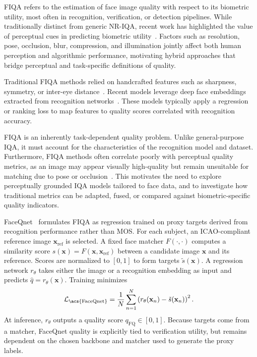 \acs{FIQA} refers to the estimation of face image quality with respect to its biometric utility, most often in recognition, verification, or detection pipelines. While traditionally distinct from generic \acs{NR-IQA}, recent work has highlighted the value of perceptual cues in predicting biometric utility~\cite{survey2022fiqa, abed2025fiqabiometric}. Factors such as resolution, pose, occlusion, blur, compression, and illumination jointly affect both human perception and algorithmic performance, motivating hybrid approaches that bridge perceptual and task-specific definitions of quality.

Traditional \acs{FIQA} methods relied on handcrafted features such as sharpness, symmetry, or inter-eye distance~\cite{phillips2003face}. Recent models leverage deep face embeddings extracted from recognition networks~\cite{terhorst2020serfiq, best2017facerecon}. These models typically apply a regression or ranking loss to map features to quality scores correlated with recognition accuracy.

\acs{FIQA} is an inherently task-dependent quality problem. Unlike general-purpose \acs{IQA}, it must account for the characteristics of the recognition model and dataset. Furthermore, \acs{FIQA} methods often correlate poorly with perceptual quality metrics, as an image may appear visually high-quality but remain unsuitable for matching due to pose or occlusion~\cite{babnik2022bias}. This motivates the need to explore perceptually grounded \acs{IQA} models tailored to face data, and to investigate how traditional metrics can be adapted, fused, or compared against biometric-specific quality indicators.

\acf{FaceQnet}~\cite{hernandez2019faceqnet} formulates \acs{FIQA} as regression trained on proxy targets derived from recognition performance rather than \acs{MOS}. For each subject, an \acs{ICAO}-compliant reference image \(\mathbf{x}_{\mathrm{ref}}\) is selected. A fixed face matcher \(F(\cdot,\cdot)\) computes a similarity score \(s(\mathbf{x})=F(\mathbf{x},\mathbf{x}_{\mathrm{ref}})\) between a candidate image \(\mathbf{x}\) and its reference. Scores are normalized to \([0,1]\) to form targets \(\tilde{s}(\mathbf{x})\). A regression network \(r_{\theta}\) takes either the image or a recognition embedding as input and predicts \(\hat{q}=r_{\theta}(\mathbf{x})\). Training minimizes
\begin{equation}
\mathcal{L}_{\mathrm{\acs{FaceQnet}}}=\frac{1}{N}\sum_{n=1}^{N}\left(r_{\theta}(\mathbf{x}_n)-\tilde{s}(\mathbf{x}_n)\right)^2.
\end{equation}
At inference, \(r_{\theta}\) outputs a quality score \(q_{\mathrm{FQ}}\in[0,1]\). Because targets come from a matcher, \acs{FaceQnet} quality is explicitly tied to verification utility, but remains dependent on the chosen backbone and matcher used to generate the proxy labels.

